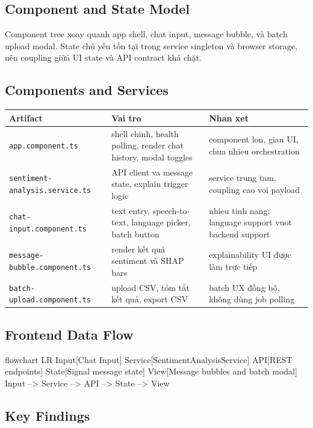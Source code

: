 \subsection{Component and State Model}
Component tree xoay quanh app shell, chat input, message bubble, và batch upload modal. State chủ yếu tồn tại trong service singleton và browser storage, nên coupling giữả UI state và API contract khá chặt.

\subsection{Components and Services}
\begin{table}[H]
\centering
\begin{tabularx}{\textwidth}{@{}l l X@{}}
\toprule
\textbf{Artifact} & \textbf{Vai tro} & \textbf{Nhan xet} \\
\midrule
\texttt{app.component.ts} & shell chinh, health polling, render chat history, modal toggles & component lon, giau UI, chua nhieu orchestration \\
\texttt{sentiment-analysis.service.ts} & API client va message state, explain trigger logic & service trung tam, coupling cao voi payload \\
\texttt{chat-input.component.ts} & text entry, speech-to-text, language picker, batch button & nhieu tinh nang; language support vuot backend support \\
\texttt{message-bubble.component.ts} & render kết quả sentiment và SHAP bars & explainability UI được làm trực tiếp \\
\texttt{batch-upload.component.ts} & upload CSV, tóm tắt kết quả, export CSV & batch UX đồng bộ, không dùng job polling \\
\bottomrule
\end{tabularx}
\end{table}

\subsection{Frontend Data Flow}
\begin{mermaidblock}
flowchart LR
  Input[Chat Input]
  Service[SentimentAnalysisService]
  API[REST endpoints]
  State[Signal message state]
  View[Message bubbles and batch modal]
  Input --> Service --> API --> State --> View
\end{mermaidblock}

\subsection{Key Findings}
